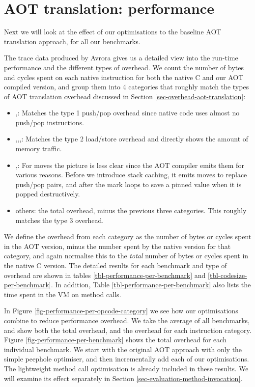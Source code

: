 


\section{AOT translation: performance}
\label{sec-evaluation-aot-translation-performance}

Next we will look at the effect of our optimisations to the baseline AOT translation approach, for all our benchmarks.

The trace data produced by Avrora gives us a detailed view into the run-time performance and the different types of overhead. We count the number of bytes and cycles spent on each native instruction for both the native C and our AOT compiled version, and group them into 4 categories that roughly match the types of AOT translation overhead discussed in Section \ref{sec-overhead-aot-translation}:
\begin{itemize}
	\item {},: Matches the type 1 push/pop overhead since native code uses almost no push/pop instructions.
	\item {},,,: Matches the type 2 load/store overhead and directly shows the amount of memory traffic.
	\item {},: For moves the picture is less clear since the AOT compiler emits them for various reasons. Before we introduce stack caching, it emits moves to replace push/pop pairs, and after the mark loops to save a pinned value when it is popped destructively.
	\item others: the total overhead, minus the previous three categories. This roughly matches the type 3 overhead.
\end{itemize}

We define the overhead from each category as the number of bytes or cycles spent in the AOT version, minus the number spent by the native version for that category, and again normalise this to the \emph{total} number of bytes or cycles spent in the native C version. The detailed results for each benchmark and type of overhead are shown in tables \ref{tbl-performance-per-benchmark} and \ref{tbl-codesize-per-benchmark}. In addition, Table \ref{tbl-performance-per-benchmark} also lists the time spent in the VM on method calls.

In Figure \ref{fig-performance-per-opcode-category} we see how our optimisations combine to reduce performance overhead. We take the average of all benchmarks, and show both the total overhead, and the overhead for each instruction category. Figure \ref{fig-performance-per-benchmark} shows the total overhead for each individual benchmark. We start with the original AOT approach with only the simple peephole optimiser, and then incrementally add each of our optimisations. The lightweight method call optimisation is already included in these results. We will examine its effect separately in Section \ref{sec-evaluation-method-invocation}.

